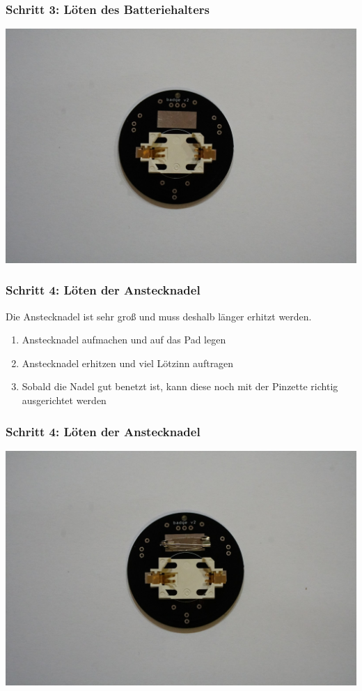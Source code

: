 \documentclass[10pt]{beamer}
\begin{document}
	\begin{frame}
		\frametitle{Schritt 3: Löten des Batteriehalters}
		\includegraphics[width=\linewidth]{images/badge18/battHolderInPlace.JPG}
	\end{frame}

	\begin{frame}
	\frametitle{Schritt 4: Löten der Anstecknadel}
	Die Anstecknadel ist sehr groß und muss deshalb länger erhitzt werden.
	\begin{enumerate} 
		\item{Anstecknadel aufmachen und auf das Pad legen}
		\item{Anstecknadel erhitzen und viel Lötzinn auftragen}
		\item{Sobald die Nadel gut benetzt ist, kann diese noch mit der Pinzette richtig ausgerichtet werden}
	\end{enumerate}
	\end{frame}

	\begin{frame}
		\frametitle{Schritt 4: Löten der Anstecknadel}
		\includegraphics[width=\linewidth]{images/badge18/needleAndHolder.JPG}
	\end{frame}
\end{document}
